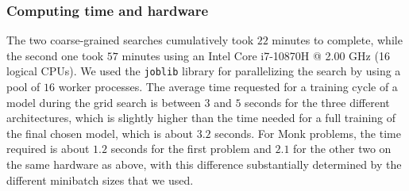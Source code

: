 \begin{table}[htb]
    \centering
    \caption{Hyperparameters and average training, validation and test error (MEE) of the 8 most performant configurations after last grid search}
    \label{table:grid_search_results}
\end{table}

\subsubsection{Computing time and hardware}
The two coarse-grained searches cumulatively took $22$ minutes to complete, while the second one took $57$ minutes using an Intel Core i7-10870H @ 2.00 GHz (16 logical CPUs). We used the \texttt{joblib} library for parallelizing the search by using a pool of $16$ worker processes. The average time requested for a training cycle of a model during the grid search is between $3$ and $5$ seconds for the three different architectures, which is slightly higher than the time needed for a full training of the final chosen model, which is about $3.2$ seconds. For Monk problems, the time required is about $1.2$ seconds for the first problem and $2.1$ for the other two on the same hardware as above, with this difference substantially determined by the different minibatch sizes that we used.

